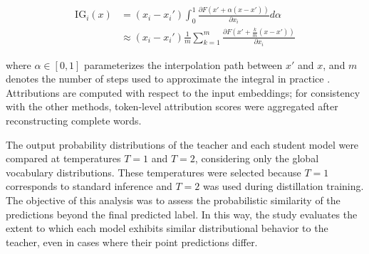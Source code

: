 \documentclass[conference]{IEEEtran}
\begin{document}
\[
\begin{aligned}
\mathrm{IG}_i(x)
&=
(x_i - x_i')
\int_0^1
\frac{
\partial F\left(x' + \alpha(x-x')\right)
}{
\partial x_i
}
d\alpha \\
&\approx
(x_i - x_i')
\frac{1}{m}
\sum_{k=1}^{m}
\frac{
\partial F\left(
x' + \frac{k}{m}(x-x')
\right)
}{
\partial x_i
}
\end{aligned}
\]

where $\alpha \in [0,1]$ parameterizes the interpolation path between $x'$ and $x$, and $m$ denotes the number of steps used to approximate the integral in practice \cite{sundararajan2017axiomatic}. Attributions are computed with respect to the input embeddings; for consistency with the other methods, token-level attribution scores were aggregated after reconstructing complete words.

The output probability distributions of the teacher and each student model were compared at temperatures $T=1$ and $T=2$, considering only the global vocabulary distributions. These temperatures were selected because $T=1$ corresponds to standard inference and $T=2$ was used during distillation training. The objective of this analysis was to assess the probabilistic similarity of the predictions beyond the final predicted label. In this way, the study evaluates the extent to which each model exhibits similar distributional behavior to the teacher, even in cases where their point predictions differ.
\end{document}
